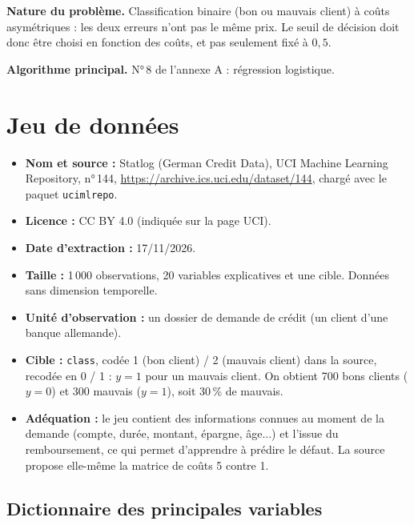 \documentclass[11pt,a4paper]{article}
\begin{document}
\textbf{Nature du problème.} Classification binaire (bon ou mauvais client) à coûts asymétriques : les deux erreurs n'ont pas le même prix. Le seuil de décision doit donc être choisi en fonction des coûts, et pas seulement fixé à $0{,}5$.

\textbf{Algorithme principal.} N°\,8 de l'annexe A : régression logistique.

\section{Jeu de données}
\begin{itemize}[nosep]
  \item \textbf{Nom et source :} Statlog (German Credit Data), UCI Machine Learning Repository, n°\,144, \url{https://archive.ics.uci.edu/dataset/144}, chargé avec le paquet \texttt{ucimlrepo}.
  \item \textbf{Licence :} CC BY 4.0 (indiquée sur la page UCI).
  \item \textbf{Date d'extraction :} 17/11/2026.
  \item \textbf{Taille :} 1\,000 observations, 20 variables explicatives et une cible. Données sans dimension temporelle.
  \item \textbf{Unité d'observation :} un dossier de demande de crédit (un client d'une banque allemande).
  \item \textbf{Cible :} \texttt{class}, codée 1 (bon client) / 2 (mauvais client) dans la source, recodée en 0 / 1 : $y=1$ pour un mauvais client. On obtient 700 bons clients ($y=0$) et 300 mauvais ($y=1$), soit 30\,\% de mauvais.
  \item \textbf{Adéquation :} le jeu contient des informations connues au moment de la demande (compte, durée, montant, épargne, âge...) et l'issue du remboursement, ce qui permet d'apprendre à prédire le défaut. La source propose elle-même la matrice de coûts 5 contre 1.
\end{itemize}

\subsection*{Dictionnaire des principales variables}
\end{document}
